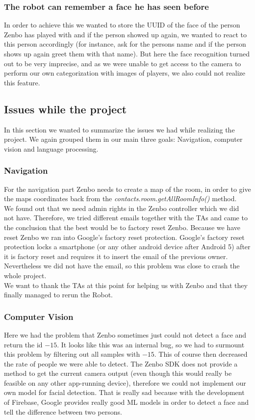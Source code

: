 \documentclass[conference]{IEEEtran}
\begin{document}
\subsubsection{The robot can remember a face he has seen before}
In order to achieve this we wanted to store the UUID of the face of the person Zenbo has played with and if the person showed up again, we wanted to
react to this person accordingly (for instance, ask for the persons name and if the person shows up again greet them with that name).
But here the face recognition turned out to be very imprecise, and as we were unable to get access to the camera to perform our own categorization with images of players, we also could not realize this feature.
\subsection{Issues while the project}
In this section we wanted to summarize the issues we had while realizing the project. We again grouped them in our 
main three goals: Navigation, computer vision and language processing.
\subsubsection{Navigation}
For the navigation part Zenbo needs to create a map of the room, in order to give the maps coordinates back from the \textit{contacts.room.getAllRoomInfo()} method.\\
We found out that we need admin rights in the Zenbo controller which we did not have. Therefore, we tried different emails together with the TAs 
and came to the conclusion that the best would be to factory reset Zenbo. Because we have reset Zenbo we ran into Google's factory reset protection.
Google's factory reset protection locks a smartphone (or any other android device after Android 5) 
after it is factory reset and requires it to insert the email of the previous owner. 
Nevertheless we did not have the email, so this problem was close to crash the whole project.\\
We want to thank the TAs at this point for helping us with Zenbo and that they finally managed to rerun the Robot.
\subsubsection{Computer Vision}
Here we had the problem that Zenbo sometimes just could not detect a face and return the id $-15$. 
It looks like this was an internal bug, so we had to surmount this problem by filtering out all samples with $-15$.
This of course then decreased the rate of people we were able to detect.
The Zenbo SDK does not provide a method to get the current camera output (even though this would really be feasible on any other app-running device),
therefore we could not implement our own model for facial detection. That is really sad because with the development of Firebase, Google provides
really good ML models in order to detect a face and tell the difference between two persons.
\end{document}
